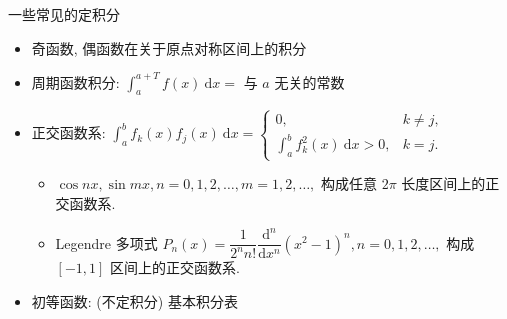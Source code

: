 \begin{frame}{一些常见的定积分}

\begin{itemize}[<+->]
\item 奇函数, 偶函数在关于原点对称区间上的积分
\item 周期函数积分: $\int_a^{a+T} f(x) ~ \mathrm{d} x = $ 与 $a$ 无关的常数
\item 正交函数系: $\int_a^b f_k(x)f_j(x) ~ \mathrm{d} x = \begin{cases}
  0, & k \neq j, \\
  \int_a^b f_k^2(x) ~ \mathrm{d} x > 0, & k = j.
\end{cases}$
\begin{itemize}[<+->]
\item $\cos nx, \sin mx, n = 0, 1, 2, \dots, m = 1, 2, \dots,$ 构成任意 $2\pi$ 长度区间上的正交函数系.
\item Legendre 多项式 $P_n(x) = \dfrac{1}{2^n n!} \dfrac{\mathrm{d}^n}{\mathrm{d}x^n}(x^2-1)^n, n = 0, 1, 2, \dots,$ 构成 $[-1, 1]$ 区间上的正交函数系.
\end{itemize}
\item 初等函数: (不定积分) 基本积分表
\end{itemize}

\end{frame}


